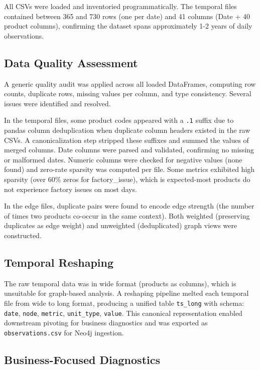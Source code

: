 \documentclass[11pt,a4paper]{article}
\begin{document}
All CSVs were loaded and inventoried programmatically. The temporal files contained between 365 and 730 rows (one per date) and 41 columns (Date + 40 product columns), confirming the dataset spans approximately 1-2 years of daily observations.

\subsection{Data Quality Assessment}

A generic quality audit was applied across all loaded DataFrames, computing row counts, duplicate rows, missing values per column, and type consistency. Several issues were identified and resolved.

In the temporal files, some product codes appeared with a \texttt{.1} suffix due to pandas column deduplication when duplicate column headers existed in the raw CSVs. A canonicalization step stripped these suffixes and summed the values of merged columns. Date columns were parsed and validated, confirming no missing or malformed dates. Numeric columns were checked for negative values (none found) and zero-rate sparsity was computed per file. Some metrics exhibited high sparsity (over 60\% zeros for factory\_issue), which is expected-most products do not experience factory issues on most days.

In the edge files, duplicate pairs were found to encode edge strength (the number of times two products co-occur in the same context). Both weighted (preserving duplicates as edge weight) and unweighted (deduplicated) graph views were constructed.

\subsection{Temporal Reshaping}

The raw temporal data was in wide format (products as columns), which is unsuitable for graph-based analysis. A reshaping pipeline melted each temporal file from wide to long format, producing a unified table \texttt{ts\_long} with schema: \texttt{date}, \texttt{node}, \texttt{metric}, \texttt{unit\_type}, \texttt{value}. This canonical representation enabled downstream pivoting for business diagnostics and was exported as \texttt{observations.csv} for Neo4j ingestion.

\subsection{Business-Focused Diagnostics}
\end{document}
